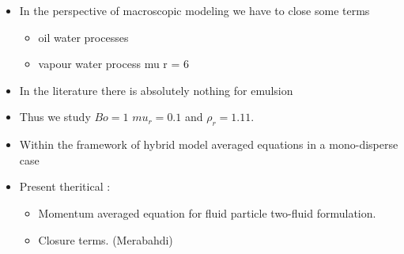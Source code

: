 \begin{itemize}
    \item In the perspective of macroscopic modeling we have to close some terms 
    \begin{itemize}
        \item oil water processes
        \item vapour water process mu r = 6 
    \end{itemize}
    \item In the literature there is absolutely nothing for emulsion 
    \item Thus we study $Bo = 1$ $mu_r = 0.1$ and $\rho_r = 1.11$. 
    \item Within the framework of hybrid model averaged equations in a mono-disperse case 
    \item Present theritical : 
     \begin{itemize}
        \item Momentum averaged equation for fluid particle two-fluid formulation. 
        \item Closure terms. (Merabahdi)
    \end{itemize}
\end{itemize}